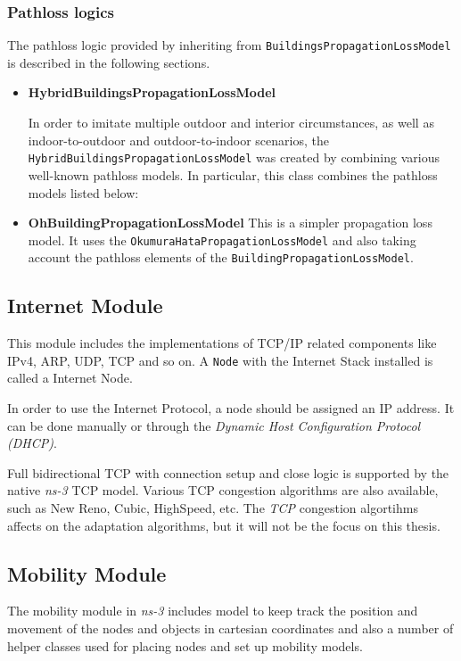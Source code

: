 \subsubsection{Pathloss logics}
The pathloss logic provided by inheriting from \texttt{BuildingsPropagationLossModel}
is described in the following sections.
\begin{itemize}
  \item \textbf{HybridBuildingsPropagationLossModel}

  In order to imitate multiple outdoor and interior circumstances, as well as indoor-to-outdoor 
  and outdoor-to-indoor scenarios, the \texttt{HybridBuildingsPropagationLossModel} was created by 
  combining various well-known pathloss models. In particular, this class combines the pathloss 
  models listed below:

  \item \textbf{OhBuildingPropagationLossModel}
  This is a simpler propagation loss model. It uses the \texttt{OkumuraHataPropagationLossModel} and 
  also taking account the pathloss elements of the \texttt{BuildingPropagationLossModel}.
\end{itemize}

\subsection{Internet Module}
This module includes the implementations of TCP/IP related components like IPv4, ARP, UDP, TCP and so on.
A \texttt{Node} with the Internet Stack installed is called a Internet Node.

In order to use the Internet Protocol, a node should be assigned an IP address. It can be done manually
or through the \textit{Dynamic Host Configuration Protocol (DHCP)}.

Full bidirectional TCP with connection setup and close logic is supported by the native \textit{ns-3} TCP model.
Various TCP congestion algorithms are also available, such as New Reno, Cubic, HighSpeed, etc.
The \textit{TCP} congestion algortihms affects on the adaptation algorithms, but it will
not be the focus on this thesis.


\subsection{Mobility Module}
The mobility module in \textit{ns-3} includes model to keep track the position and movement of the nodes and objects 
in cartesian coordinates and also a number of helper classes used for placing nodes and set up mobility 
models.

